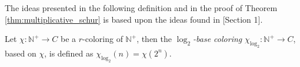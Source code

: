 

The ideas presented in the following definition and in the proof of Theorem \ref{thm:multiplicative_schur} is based upon the ideas found in \cite{exponential_ultrafilters_and_patterns_in_Ramsey_theory}[Section 1].
\begin{definition}
	Let $\chi: \mathbb{N}^{+} \to C$ be a $r$-coloring of $\mathbb{N}^+$, then the \textit{$\log_2$-base coloring} $\chi_{\log_2}: \mathbb{N}^+ \to C$, based on $\chi$, is defined as $\chi_{\log_2}(n) = \chi(2^{n})$.
\end{definition}


